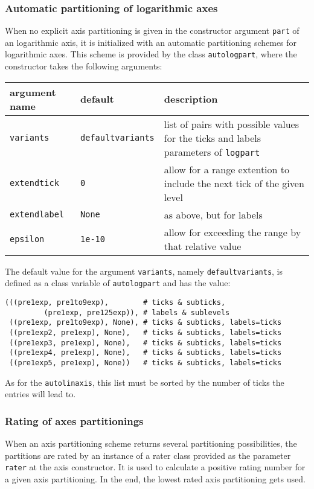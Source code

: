 \subsubsection{Automatic partitioning of logarithmic axes}

When no explicit axis partitioning is given in the constructor
argument \verb|part| of an logarithmic axis, it is initialized with an
automatic partitioning schemes for logarithmic axes. This scheme is
provided by the class \verb|autologpart|, where the constructor takes
the following arguments:

\medskip
\begin{tabularx}{\linewidth}{ll>{\raggedright\arraybackslash}X}
argument name&default&description\\
\hline
\texttt{variants}&\texttt{defaultvariants}&list of pairs with possible values for the ticks and labels parameters of \texttt{logpart}\\
\texttt{extendtick}&\texttt{0}&allow for a range extention to include the next tick of the given level\\
\texttt{extendlabel}&\texttt{None}&as above, but for labels\\
\texttt{epsilon}&\texttt{1e-10}&allow for exceeding the range by that relative value\\
\end{tabularx}
\medskip

The default value for the argument \verb|variants|, namely
\verb|defaultvariants|, is defined as a class variable of
\verb|autologpart| and has the value:
\begin{verbatim}
(((pre1exp, pre1to9exp),        # ticks & subticks,
         (pre1exp, pre125exp)), # labels & sublevels
 ((pre1exp, pre1to9exp), None), # ticks & subticks, labels=ticks
 ((pre1exp2, pre1exp), None),   # ticks & subticks, labels=ticks
 ((pre1exp3, pre1exp), None),   # ticks & subticks, labels=ticks
 ((pre1exp4, pre1exp), None),   # ticks & subticks, labels=ticks
 ((pre1exp5, pre1exp), None))   # ticks & subticks, labels=ticks
\end{verbatim}
As for the \verb|autolinaxis|, this list must be sorted by the number
of ticks the entries will lead to.

\subsubsection{Rating of axes partitionings}

When an axis partitioning scheme returns several partitioning
possibilities, the partitions are rated by an instance of a rater
class provided as the parameter \verb|rater| at the axis constructor.
It is used to calculate a positive rating number for a given axis
partitioning. In the end, the lowest rated axis partitioning gets
used.

